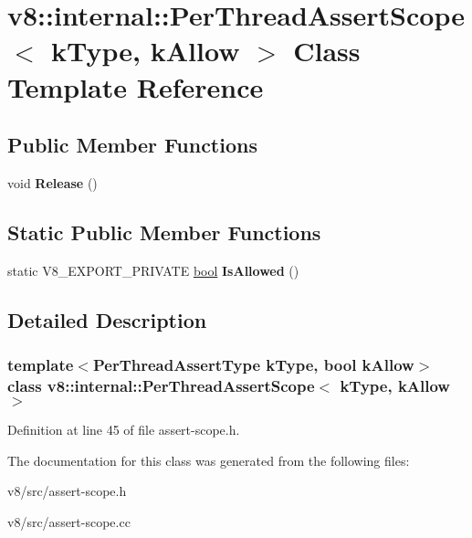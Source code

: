 \hypertarget{classv8_1_1internal_1_1PerThreadAssertScope}{}\section{v8\+:\+:internal\+:\+:Per\+Thread\+Assert\+Scope$<$ k\+Type, k\+Allow $>$ Class Template Reference}
\label{classv8_1_1internal_1_1PerThreadAssertScope}
\subsection*{Public Member Functions}
\begin{DoxyCompactItemize}
\item 
\mbox{\label{classv8_1_1internal_1_1PerThreadAssertScope_acf2ae068ec83aa7d1b4e0dfc1766e9c1}} 
void {\bfseries Release} ()
\end{DoxyCompactItemize}
\subsection*{Static Public Member Functions}
\begin{DoxyCompactItemize}
\item 
\mbox{\label{classv8_1_1internal_1_1PerThreadAssertScope_a3ca2150bfbb1706a8ed30b3caad7a604}} 
static V8\+\_\+\+E\+X\+P\+O\+R\+T\+\_\+\+P\+R\+I\+V\+A\+TE \mbox{\hyperlink{classbool}{bool}} {\bfseries Is\+Allowed} ()
\end{DoxyCompactItemize}


\subsection{Detailed Description}
\subsubsection*{template$<$Per\+Thread\+Assert\+Type k\+Type, bool k\+Allow$>$\newline
class v8\+::internal\+::\+Per\+Thread\+Assert\+Scope$<$ k\+Type, k\+Allow $>$}



Definition at line 45 of file assert-\/scope.\+h.



The documentation for this class was generated from the following files\+:\begin{DoxyCompactItemize}
\item 
v8/src/assert-\/scope.\+h\item 
v8/src/assert-\/scope.\+cc\end{DoxyCompactItemize}

